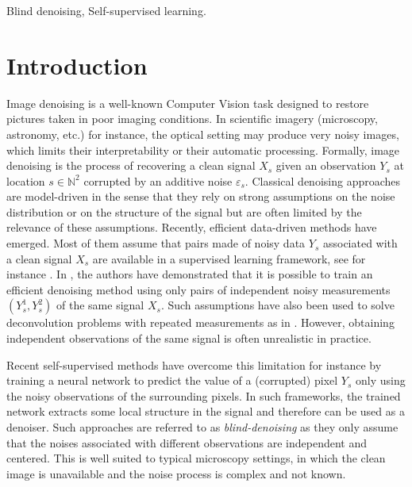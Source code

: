 \documentclass[lettersize,journal]{IEEEtran}
\begin{document}
\begin{IEEEkeywords}
Blind denoising, Self-supervised learning.
\end{IEEEkeywords}






%
\IEEEpeerreviewmaketitle


\section{Introduction}
\label{sec:introduction}

Image denoising is a well-known Computer Vision task designed to restore pictures taken in poor imaging conditions. In scientific imagery (microscopy, astronomy, etc.) for instance,  the optical setting may produce very noisy images, which limits their interpretability or their automatic processing.
Formally, image denoising is the process of recovering a clean signal $X_s$ given an observation $Y_s$ at location $s\in \mathbb{N}^2$ corrupted by an additive noise $\varepsilon_s$. Classical denoising approaches are model-driven in the sense that they rely on strong assumptions on the noise distribution or on the structure of the signal but are often limited by the relevance of these assumptions.
Recently, efficient data-driven methods have emerged. Most of them assume that pairs made of noisy data $Y_s$ associated with a clean signal $X_s$ are available in a supervised learning framework, see for instance \cite{weigert2017content}. In \cite{lehtinen2018noise2noise}, the authors have demonstrated that it is possible to train an efficient denoising method using only pairs of independent noisy measurements $(Y_s^1, Y_s^2)$ of the same signal $X_s$. Such assumptions have also been used to solve deconvolution problems with repeated measurements as in \cite{delaigle2008deconvolution}. However, obtaining independent observations of the same signal is often unrealistic in practice.

Recent self-supervised methods have overcome this limitation \cite{batson2019noise2self,krull2018noise2void,quan2020self} for instance by training a neural network to predict the value of a (corrupted) pixel $Y_s$ only using the noisy observations of the surrounding pixels. In such frameworks, the trained network extracts some local structure in the signal and therefore can be used as a denoiser. Such approaches are referred to as \textit{blind-denoising} as they only assume that the noises associated with different observations are independent and centered.
This is well suited to typical microscopy settings, in which the clean image is unavailable and the noise process is complex and not known.
\end{document}
